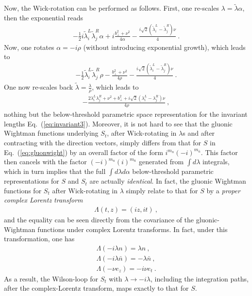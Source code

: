 \documentclass[a4paper,11pt]{article}
\begin{document}
Now, the Wick-rotation can be performed as follows. First, one re-scales $\lambda=\tilde \lambda \alpha$, then the exponential reads
\begin{align}
-\frac{1}{2}i\tilde \lambda_i^L\tilde \lambda^R_j \alpha+i\frac{b_\perp^2+\nu^2}{4\alpha}-\frac{i\sqrt{2}(\tilde \lambda^L_i-\tilde \lambda^R_j)\nu}{4} \ .
\end{align}
Now, one rotates $\alpha=-i\rho$ (without introducing exponential growth), which leads to
\begin{align}
-\frac{1}{2}\tilde \lambda_i^L\tilde \lambda^R_j \rho-\frac{b_\perp^2+\nu^2}{4\rho}-\frac{i\sqrt{2}(\tilde \lambda^L_i-\tilde \lambda^R_j)\nu}{4} \ .
\end{align}
One now re-scales back $\tilde \lambda=\frac{\lambda}{\rho}$, which leads to
\begin{align}
-\frac{2\lambda_i^L\lambda^R_j+\nu^2+b_\perp^2+i\sqrt{2}(\lambda^L_i-\lambda^R_j)\nu}{4\rho} \ ,
\end{align}
nothing but the below-threshold parametric space representation for the invariant lengths Eq.~(\ref{eq:invariant3}). Moreover, it is not hard to see that the gluonic Wightman functions underlying $S_t$, after Wick-rotating in $\lambda$s and after contracting with the direction vectors, simply differs from that for $S$ in Eq.~(\ref{eq:gluonwight}) by an overall factor of the form $i^{m_n}(-i)^{m_{\bar n}}$. This factor then cancels with the factor $(-i)^{m_n}(i)^{m_{\bar n}}$ generated from $\int d\lambda$ integrals, which in turn implies that the full $\int d\lambda d\alpha$ below-threshold parametric representations for $S$ and $S_t$ are actually {\it identical}. In fact, the gluonic Wightman functions for $S_t$ after Wick-rotating in $\lambda$ simply relate to that for $S$ by a {\it proper complex Lorentz transform}
\begin{align}\label{eq:defcompL}
\Lambda(t,z)=(iz,it) \ ,
\end{align}
and the equality can be seen directly from the covariance of the gluonic-Wightman functions under complex Lorentz transforms. In fact, under this transformation, one has
\begin{align}
\Lambda (-i\lambda n)=\lambda n \ , \\
\Lambda(-i\lambda \bar n)=-\lambda \bar n \ , \\
\Lambda (-\nu e_z)=-i\nu e_t \ .
\end{align}
As a result, the Wilson-loop for $S_t$ with $\lambda \rightarrow -i\lambda$, including the integration paths, after the complex-Lorentz transform, maps exactly to that for $S$.
\end{document}

